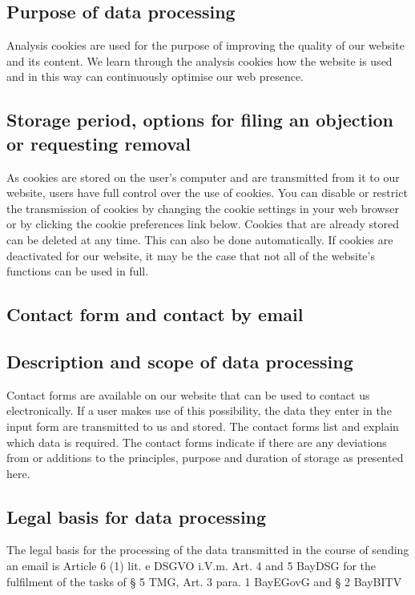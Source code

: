 \documentclass[letterpaper,10pt,english]{sphinxmanual}
\begin{document}
\subsection{Purpose of data processing}
\label{\detokenize{policies/privacy:id3}}
\sphinxAtStartPar
Analysis cookies are used for the purpose of improving the quality of our website and its content. We learn through the analysis cookies how the website is used and in this way can continuously optimise our web presence.


\subsection{Storage period, options for filing an objection or requesting removal}
\label{\detokenize{policies/privacy:storage-period-options-for-filing-an-objection-or-requesting-removal}}
\sphinxAtStartPar
As cookies are stored on the user’s computer and are transmitted from it to our website, users have full control over the use of cookies. You can disable or restrict the transmission of cookies by changing the cookie settings in your web browser or by clicking the cookie preferences link below. Cookies that are already stored can be deleted at any time. This can also be done automatically. If cookies are deactivated for our website, it may be the case that not all of the website’s functions can be used in full.


\subsection{Contact form and contact by email}
\label{\detokenize{policies/privacy:contact-form-and-contact-by-email}}

\subsection{Description and scope of data processing}
\label{\detokenize{policies/privacy:id4}}
\sphinxAtStartPar
Contact forms are available on our website that can be used to contact us electronically. If a user makes use of this possibility, the data they enter in the input form are transmitted to us and stored. The contact forms list and explain which data is required. The contact forms indicate if there are any deviations from or additions to the principles, purpose and duration of storage as presented here.


\subsection{Legal basis for data processing}
\label{\detokenize{policies/privacy:id5}}
\sphinxAtStartPar
The legal basis for the processing of the data transmitted in the course of sending an email is Article 6 (1) lit. e DSGVO i.V.m. Art. 4 and 5 BayDSG for the fulfilment of the tasks of \S{} 5 TMG, Art. 3 para. 1 BayEGovG and \S{} 2 BayBITV
\end{document}

